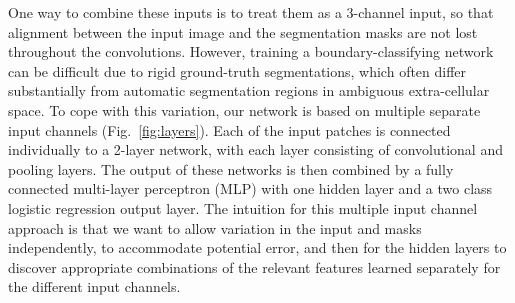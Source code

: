 One way to combine these inputs is to treat them as a 3-channel input, so that alignment between the input image and the segmentation masks are not lost throughout the convolutions. However, training a boundary-classifying network can be difficult due to rigid ground-truth segmentations, which often differ substantially from automatic segmentation regions in ambiguous extra-cellular space. To cope with this variation, our network is based on multiple separate input channels (Fig.~\ref{fig:layers}). Each of the input patches is connected individually to a 2-layer network, with each layer consisting of convolutional and pooling layers. The output of these networks is then combined by a fully connected multi-layer perceptron (MLP) with one hidden layer and a two class logistic regression output layer. The intuition for this multiple input channel approach is that we want to allow variation in the input and masks independently, to accommodate potential error, and then for the hidden layers to discover appropriate combinations of the relevant features learned separately for the different input channels.



%  


